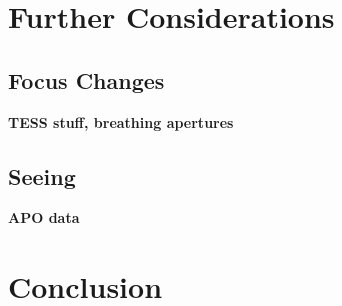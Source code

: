 \documentclass[12pt,preprint]{emulateapj}
\begin{document}
\section{Further Considerations}

\subsection{Focus Changes}

\textbf{TESS stuff, breathing apertures}

\subsection{Seeing}

\textbf{APO data}

\section{Conclusion}

\clearpage


\end{document}
